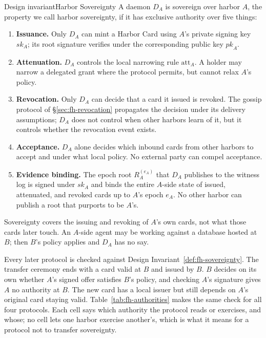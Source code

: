 \documentclass[11pt,a4paper]{article}
\theoremstyle{definition}
\theoremstyle{remark}
\begin{document}
\begin{pdclaim}{Design invariant}{Harbor Sovereignty}
\setlength{\parskip}{4pt plus 1pt}
\label{def:fh-sovereignty}
A daemon $D_A$ is sovereign over harbor $A$, the property we call harbor sovereignty, if it has exclusive authority over five things:
\begin{enumerate}[nosep]
\item \textbf{Issuance.} Only $D_A$ can mint a Harbor Card using $A$'s private signing key $\mathit{sk}_A$; its root signature verifies under the corresponding public key $\mathit{pk}_A$.
\item \textbf{Attenuation.} $D_A$ controls the local narrowing rule $\mathrm{att}_A$. A holder may
narrow a delegated grant where the protocol permits, but cannot relax
$A$'s policy.
\item \textbf{Revocation.} Only $D_A$ can decide that a card it issued is revoked. The gossip protocol of \S\ref{sec:fh-revocation} propagates the \mbox{decision}
under its delivery assumptions; $D_A$ does not control when other harbors learn of it, but it controls whether the revocation event exists.
\item \textbf{Acceptance.} $D_A$ alone decides which inbound cards from other harbors to accept and under what local policy. No external party can compel acceptance.
\item \textbf{Evidence binding.} The epoch root $R_A^{(e_A)}$ that $D_A$ publishes to the witness log is signed under $\mathit{sk}_A$ and binds the entire $A$-side state of issued, attenuated, and revoked cards up to $A$'s epoch $e_A$. No other harbor can publish a root that purports to be $A$'s.
\end{enumerate}
Sovereignty covers the issuing and revoking of $A$'s own cards, not what those cards later touch. An $A$-side agent may be working against a database hosted at $B$; then $B$'s policy applies and $D_A$ has no say.
\end{pdclaim}
Every later protocol is checked against Design Invariant~\ref{def:fh-sovereignty}. The transfer ceremony ends with a card valid at $B$ and issued by $B$. $B$ decides
on its own whether $A$'s signed offer satisfies $B$'s policy, and checking
$A$'s signature gives $A$ no authority at $B$. The new card has a local issuer
but still depends on $A$'s original card staying valid.
Table~\ref{tab:fh-authorities} makes the same check for all four protocols.
Each cell says which authority the protocol reads or exercises, and whose; no
cell lets one harbor exercise another's, which is what it means for a protocol
not to transfer sovereignty.
\end{document}
